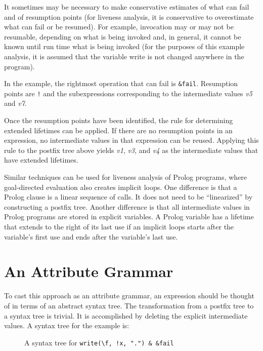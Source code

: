 It sometimes may be necessary to make conservative estimates of what
can fail and of resumption points (for liveness analysis, it is
conservative to overestimate what can fail or be resumed). For
example, invocation may or may not be resumable, depending on what is
being invoked and, in general, it cannot be known until run time what
is being invoked (for the purposes of this example analysis, it is
assumed that the variable write is not changed anywhere in the
program).

In the example, the rightmost operation that can fail is
\texttt{\&fail}. Resumption points are \texttt{!} and the
subexpressions corresponding to the intermediate values \textit{v5}
and \textit{v7}.

Once the resumption points have been identified, the rule for
determining extended lifetimes can be applied. If there are no
resumption points in an expression, no intermediate values in that
expression can be reused. Applying this rule to the postfix tree above
yields \textit{v1}, \textit{v3}, and \textit{v4} as the intermediate
values that have extended lifetimes.

Similar techniques can be used for liveness analysis of Prolog
programs, where goal-directed evaluation also creates implicit
loops. One difference is that a Prolog clause is a linear sequence of
calls. It does not need to be ``linearized'' by constructing a
postfix tree. Another difference is that all intermediate values in
Prolog programs are stored in explicit variables. A Prolog variable
has a lifetime that extends to the right of its last use if an
implicit loops starts after the variable's first use and ends after
the variable's last use.


\section{An Attribute Grammar}

To cast this approach as an attribute grammar, an expression should be
thought of in terms of an abstract syntax tree.  The transformation
from a postfix tree to a syntax tree is trivial. It is accomplished by
deleting the explicit intermediate values. A syntax tree for the
example is:


\begin{figure}[htb]
\begin{center}
\end{center}
\caption{A syntax tree for \texttt{write({\textbackslash}f, !x, ".") \& \&fail}}
\end{figure}

